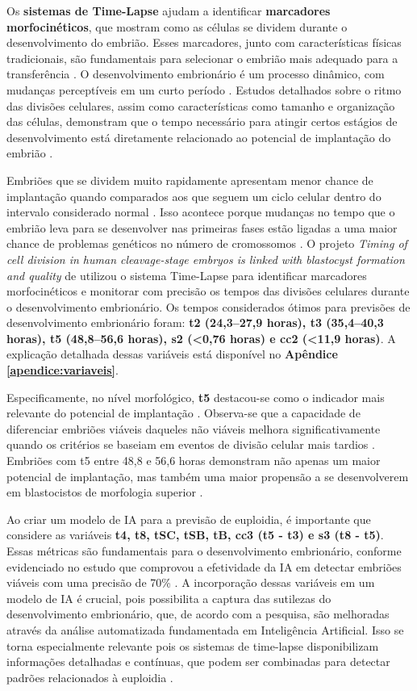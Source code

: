 Os \textbf{sistemas de Time-Lapse} ajudam a identificar \textbf{marcadores morfocinéticos}, que mostram como as células se dividem durante o desenvolvimento do embrião. Esses marcadores, junto com características físicas tradicionais, são fundamentais para selecionar o embrião mais adequado para a transferência \cite{souzarebeca2022}. O desenvolvimento embrionário é um processo dinâmico, com mudanças perceptíveis em um curto período \cite{cruz2012}. Estudos detalhados sobre o ritmo das divisões celulares, assim como características como tamanho e organização das células, demonstram que o tempo necessário para atingir certos estágios de desenvolvimento está diretamente relacionado ao potencial de implantação do embrião \cite{souzarebeca2022}.

Embriões que se dividem muito rapidamente apresentam menor chance de implantação quando comparados aos que seguem um ciclo celular dentro do intervalo considerado normal \cite{cruz2012}. Isso acontece porque mudanças no tempo que o embrião leva para se desenvolver nas primeiras fases estão ligadas a uma maior chance de problemas genéticos no número de cromossomos \cite{cruz2012}. O projeto \textit{Timing of cell division in human cleavage-stage embryos is linked with blastocyst formation and quality} de  utilizou o sistema Time-Lapse para identificar marcadores morfocinéticos e monitorar com precisão os tempos das divisões celulares durante o desenvolvimento embrionário. Os tempos considerados ótimos para previsões de desenvolvimento embrionário foram: \textbf{t2 (24,3{–}27,9 horas), t3 (35,4{–}40,3 horas), t5 (48,8{–}56,6 horas), s2 (<0,76 horas) e cc2 (<11,9 horas)}. A explicação detalhada dessas variáveis está disponível no \textbf{Apêndice \ref{apendice:variaveis}}.

Especificamente, no nível morfológico, \textbf{t5} destacou-se como o indicador mais relevante do potencial de implantação \cite{cruz2012}. Observa-se que a capacidade de diferenciar embriões viáveis daqueles não viáveis melhora significativamente quando os critérios se baseiam em eventos de divisão celular mais tardios \cite{cruz2012}. Embriões com t5 entre 48,8 e 56,6 horas demonstram não apenas um maior potencial de implantação, mas também uma maior propensão a se desenvolverem em blastocistos de morfologia superior \cite{cruz2012}.

Ao criar um modelo de IA para a previsão de euploidia, é importante que considere as variáveis \textbf{t4, t8, tSC, tSB, tB, cc3 (t5 - t3) e s3 (t8 - t5)}. Essas métricas são fundamentais para o desenvolvimento embrionário, conforme evidenciado no estudo que comprovou a efetividade da IA em detectar embriões viáveis com uma precisão de 70\% \cite{rienzi2020}. A incorporação dessas variáveis em um modelo de IA é crucial, pois possibilita a captura das sutilezas do desenvolvimento embrionário, que, de acordo com a pesquisa, são melhoradas através da análise automatizada fundamentada em Inteligência Artificial. Isso se torna especialmente relevante pois os sistemas de time-lapse disponibilizam informações detalhadas e contínuas, que podem ser combinadas para detectar padrões relacionados à euploidia \cite{rienzi2020}.

